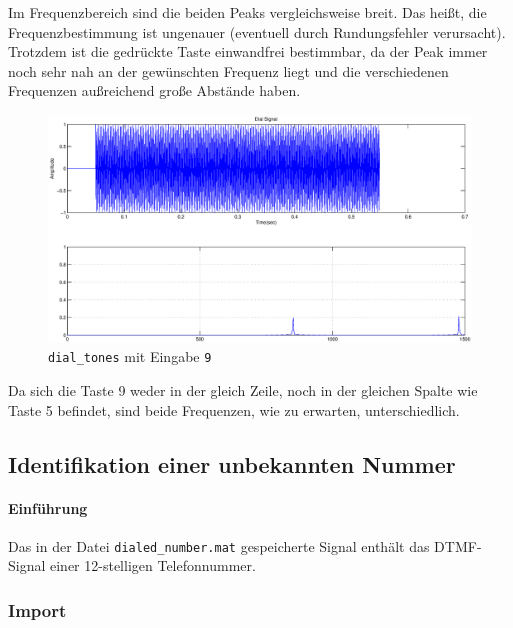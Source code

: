 \documentclass[10pt]{report}
\begin{document}
        Im Frequenzbereich sind die beiden Peaks vergleichsweise breit. Das heißt, die
        Frequenzbestimmung ist ungenauer (eventuell durch Rundungsfehler verursacht).
        Trotzdem ist die gedrückte Taste einwandfrei bestimmbar, da der Peak immer noch
        sehr nah an der gewünschten Frequenz liegt und die verschiedenen Frequenzen
        außreichend große Abstände haben.

        \vspace{2cm}

        \begin{center}
            \begin{figure}[H]
                \includegraphics[width=\textwidth]{img43422}
                \caption{\texttt{dial\_tones} mit Eingabe \texttt{9}}
            \end{figure}
        \end{center}

        Da sich die Taste 9 weder in der gleich Zeile, noch in der gleichen Spalte wie
        Taste 5 befindet, sind beide Frequenzen, wie zu erwarten, unterschiedlich.

        \subsection{Identifikation einer unbekannten Nummer}
        \paragraph{Einführung}
        Das in der Datei \texttt{dialed\_number.mat} gespeicherte Signal enthält das DTMF-Signal einer
        12-stelligen Telefonnummer.


        \subsubsection{Import}
\end{document}
